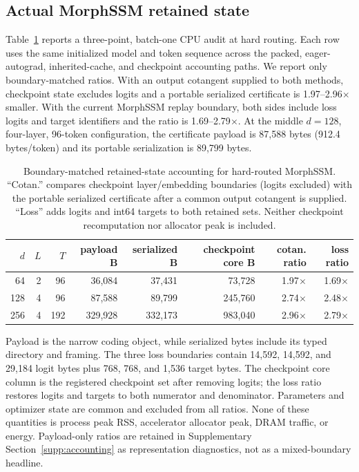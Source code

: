 \documentclass[10pt]{article}
\begin{document}
\subsection{Actual MorphSSM retained state}

Table~\ref{tab:morphssm} reports a three-point, batch-one CPU audit at hard
routing.  Each row uses the same initialized model and token sequence across
the packed, eager-autograd, inherited-cache, and checkpoint accounting paths.
We report only boundary-matched ratios.  With an output cotangent supplied to
both methods, checkpoint state excludes logits and a portable serialized
certificate is 1.97--2.96$\times$ smaller.  With the current MorphSSM replay
boundary, both sides include loss logits and target identifiers and the ratio is
1.69--2.79$\times$.  At the middle $d=128$, four-layer, 96-token configuration,
the certificate payload is 87,588 bytes (912.4 bytes/token) and its portable
serialization is 89,799 bytes.

\begin{table}[t]
\centering
\caption{Boundary-matched retained-state accounting for hard-routed MorphSSM.
``Cotan.'' compares checkpoint layer/embedding boundaries (logits excluded)
with the portable serialized certificate after a common output cotangent is
supplied.  ``Loss'' adds logits and int64 targets to both retained sets.
Neither checkpoint recomputation nor allocator peak is included.}
\label{tab:morphssm}
\small
\begin{tabular}{rrrrrrrr}
\toprule
$d$ & $L$ & $T$ & payload B & serialized B & checkpoint core B & cotan. ratio & loss ratio \\
\midrule
64  & 2 & 96  & 36,084  & 37,431  & 73,728  & 1.97$\times$ & 1.69$\times$ \\
128 & 4 & 96  & 87,588  & 89,799  & 245,760 & 2.74$\times$ & 2.48$\times$ \\
256 & 4 & 192 & 329,928 & 332,173 & 983,040 & 2.96$\times$ & 2.79$\times$ \\
\bottomrule
\end{tabular}
\end{table}

Payload is the narrow coding object, while serialized bytes include its typed
directory and framing.  The three loss boundaries contain 14,592, 14,592, and
29,184 logit bytes plus 768, 768, and 1,536 target bytes.  The checkpoint core
column is the registered checkpoint set after removing logits; the loss ratio
restores logits and targets to both numerator and denominator.  Parameters and
optimizer state are common and excluded from all ratios.  None of these
quantities is process peak RSS, accelerator allocator peak, DRAM traffic, or
energy.  Payload-only ratios are retained in
Supplementary Section~\ref{supp:accounting} as representation diagnostics, not
as a mixed-boundary headline.
\end{document}
